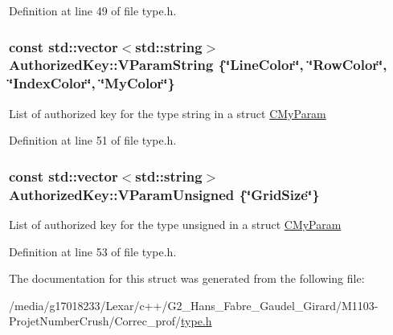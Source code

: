 Definition at line 49 of file type.\+h.

\hypertarget{struct_authorized_key_a14d2cbd0e3dcc77a793a55f988d78b73}{
\subsubsection[{V\+Param\+String}]{\setlength{\rightskip}{0pt plus 5cm}const std\+::vector$<$std\+::string$>$ Authorized\+Key\+::\+V\+Param\+String \{\char`\"{}Line\+Color\char`\"{}, \char`\"{}Row\+Color\char`\"{}, \char`\"{}Index\+Color\char`\"{}, \char`\"{}My\+Color\char`\"{}\}}}\label{struct_authorized_key_a14d2cbd0e3dcc77a793a55f988d78b73}
List of authorized key for the type string in a struct \hyperlink{struct_c_my_param}{C\+My\+Param} 

Definition at line 51 of file type.\+h.

\hypertarget{struct_authorized_key_a871173f4b0c89c91289a10f0ddc1cadd}{
\subsubsection[{V\+Param\+Unsigned}]{\setlength{\rightskip}{0pt plus 5cm}const std\+::vector$<$std\+::string$>$ Authorized\+Key\+::\+V\+Param\+Unsigned \{\char`\"{}Grid\+Size\char`\"{}\}}}\label{struct_authorized_key_a871173f4b0c89c91289a10f0ddc1cadd}
List of authorized key for the type unsigned in a struct \hyperlink{struct_c_my_param}{C\+My\+Param} 

Definition at line 53 of file type.\+h.



The documentation for this struct was generated from the following file\+:\begin{DoxyCompactItemize}
\item 
/media/g17018233/\+Lexar/c++/\+G2\+\_\+\+Hans\+\_\+\+Fabre\+\_\+\+Gaudel\+\_\+\+Girard/\+M1103-\/\+Projet\+Number\+Crush/\+Correc\+\_\+prof/\hyperlink{type_8h}{type.\+h}\end{DoxyCompactItemize}
